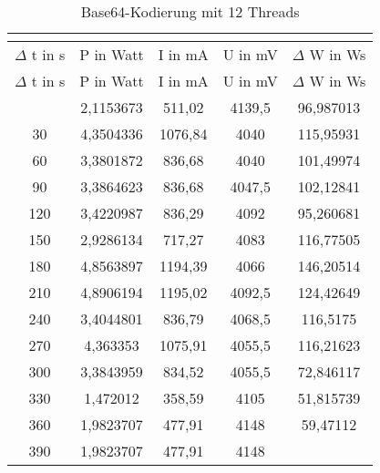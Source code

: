 

\begin{longtable}[c]{ccccc}
\caption{Base64-Kodierung mit 12 Threads} \\
\label{tab:Base64MessungThreadZwoelf}\\
\hline
{$\Delta$ t in s} & {P in Watt} & {I in mA} & {U in mV} & {$\Delta$ W in Ws} \\
\hline
\endfirsthead
\hline
$\Delta$ t in s & P in Watt & I in mA & U in mV & $\Delta$ W in Ws \\
\hline
\endhead
\hline
\endfoot
\hline
          \midrule
    0     & 2,1153673 & 511,02 & 4139,5 & 96,987013 \\
    \midrule
    30    & 4,3504336 & 1076,84 & 4040  & 115,95931 \\
    \midrule
    60    & 3,3801872 & 836,68 & 4040  & 101,49974 \\
    \midrule
    90    & 3,3864623 & 836,68 & 4047,5 & 102,12841 \\
    \midrule
    120   & 3,4220987 & 836,29 & 4092  & 95,260681 \\
    \midrule
    150   & 2,9286134 & 717,27 & 4083  & 116,77505 \\
    \midrule
    180   & 4,8563897 & 1194,39 & 4066  & 146,20514 \\
    \midrule
    210   & 4,8906194 & 1195,02 & 4092,5 & 124,42649 \\
    \midrule
    240   & 3,4044801 & 836,79 & 4068,5 & 116,5175 \\
    \midrule
    270   & 4,363353 & 1075,91 & 4055,5 & 116,21623 \\
    \midrule
    300   & 3,3843959 & 834,52 & 4055,5 & 72,846117 \\
    \midrule
    330   & 1,472012 & 358,59 & 4105  & 51,815739 \\
    \midrule
    360   & 1,9823707 & 477,91 & 4148  & 59,47112 \\
    \midrule
    390   & 1,9823707 & 477,91 & 4148  &  \\
\end{longtable}
